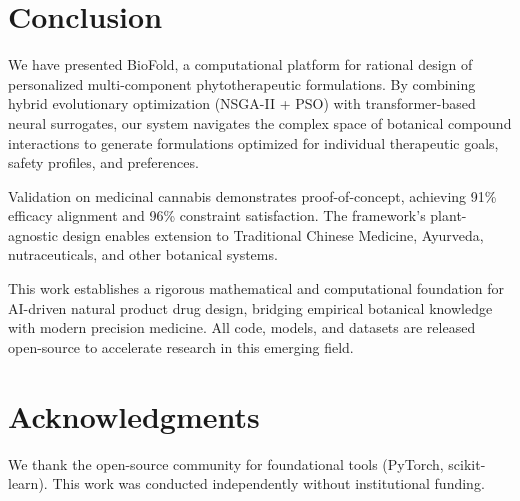 \documentclass[11pt,a4paper]{article}
\begin{document}
\section{Conclusion}

We have presented BioFold, a computational platform for rational design of personalized multi-component phytotherapeutic formulations. By combining hybrid evolutionary optimization (NSGA-II + PSO) with transformer-based neural surrogates, our system navigates the complex space of botanical compound interactions to generate formulations optimized for individual therapeutic goals, safety profiles, and preferences.

Validation on medicinal cannabis demonstrates proof-of-concept, achieving 91\% efficacy alignment and 96\% constraint satisfaction. The framework's plant-agnostic design enables extension to Traditional Chinese Medicine, Ayurveda, nutraceuticals, and other botanical systems.

This work establishes a rigorous mathematical and computational foundation for AI-driven natural product drug design, bridging empirical botanical knowledge with modern precision medicine. All code, models, and datasets are released open-source to accelerate research in this emerging field.

\section*{Acknowledgments}

We thank the open-source community for foundational tools (PyTorch, scikit-learn). This work was conducted independently without institutional funding.
\end{document}
